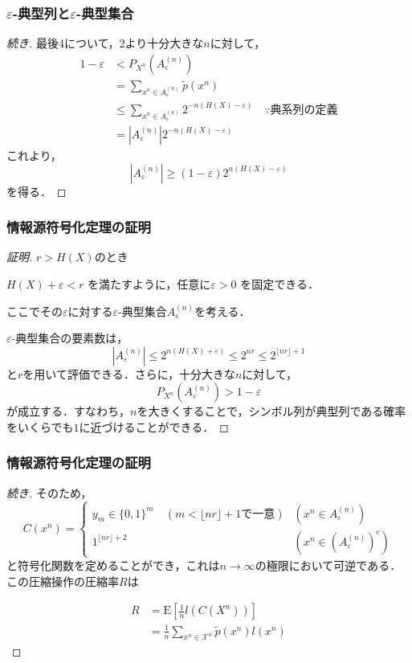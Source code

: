 \documentclass{classes/myslide}
\begin{document}
\begin{frame}\frametitle{$\varepsilon$-典型列と$\varepsilon$-典型集合}
  \begin{proof}[続き]
    最後4について，2より十分大きな$n$に対して，
    \begin{align*}
      1 - \varepsilon 
      &< P_{X^n}(A_{\varepsilon}^{(n)}) \\
      &= \sum_{x^n \in A_{\varepsilon}^{(n)}} \tilde{p}(x^n) \\
      &\leq \sum_{x^n \in A_{\varepsilon}^{(n)}} 2^{-n(H(X) - \varepsilon)} \quad \because \text{典系列の定義} \\
      &= |A_{\varepsilon}^{(n)}| 2^{-n(H(X) - \varepsilon)}
    \end{align*}
    これより，
    \[
      |A_{\varepsilon}^{(n)}| \geq (1 - \varepsilon)2^{n(H(X) - \varepsilon)}
    \]
    を得る．
  \end{proof}
\end{frame}


\begin{frame}\frametitle{情報源符号化定理の証明}
  \begin{proof}[証明]
    $r > H(X)$のとき

    $H(X) + \varepsilon < r$ を満たすように，任意に$\varepsilon > 0$ を固定できる．

    ここでその$\varepsilon$に対する$\varepsilon$-典型集合$A_{\varepsilon}^{(n)}$を考える．

    $\varepsilon$-典型集合の要素数は，
    \[ |A_{\varepsilon}^{(n)}| \leq 2^{n(H(X) + \varepsilon)}  \leq 2^{nr} \leq 2^{\lfloor nr \rfloor + 1}\]
    と$r$を用いて評価できる．さらに，十分大きな$n$に対して，
    \[ P_{X^n}(A_{\varepsilon}^{(n)}) > 1 - \varepsilon \]
    が成立する．すなわち，$n$を大きくすることで，シンボル列が典型列である確率をいくらでも$1$に近づけることができる．
    \let\qedsymbol\relax
  \end{proof}
\end{frame}

\begin{frame}\frametitle{情報源符号化定理の証明}
  \begin{proof}[続き]
    そのため，
    \[ 
      C(x^n) = 
        \begin{cases}
          y_m \in \{0, 1\}^m \quad (m <\lfloor nr \rfloor + 1 \textbf{で一意}) &  (x^n \in A_{\varepsilon}^{(n)})\\
          1^{\lfloor nr \rfloor + 2} & (x^n \in (A_{\varepsilon}^{(n)})^c)
        \end{cases}
    \]
    と符号化関数を定めることができ，これは$n \to \infty$の極限において可逆である．
    この圧縮操作の圧縮率$R$は

    \begin{align*}
      R 
      &= \mathrm{E}\left \lbrack \frac{1}{n} l(C(X^n)) \right \rbrack  \\
      &= \frac{1}{n} \sum_{x^n \in \mathcal{X}^n} \tilde{p}(x^n)l(x^n) 
    \end{align*}
    \let\qedsymbol\relax
  \end{proof}
\end{frame}
\end{document}
